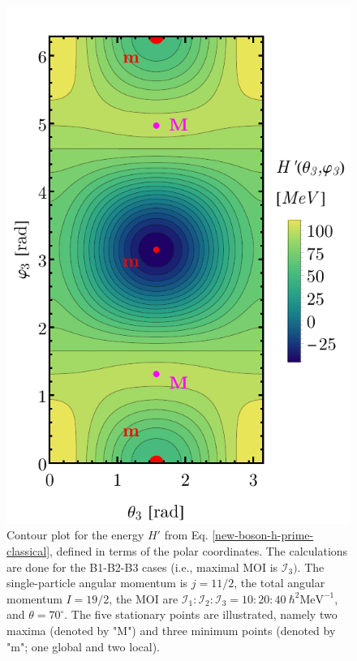 \begin{figure}
    \begin{center}
        \includegraphics[scale=0.7]{Chapters/Figures/New-Boson-Classical-H-3axis-quantization.pdf}
        \caption{Contour plot for the energy $H'$ from Eq. \ref{new-boson-h-prime-classical}, defined in terms of the polar coordinates. The calculations are done for the B1-B2-B3 cases (i.e., maximal MOI is $\mathcal{I}_3)$. The single-particle angular momentum is $j=11/2$, the total angular momentum $I=19/2$, the MOI are $\mathcal{I}_1:\mathcal{I}_2:\mathcal{I}_3=10:20:40\ \hbar^2\text{MeV}^{-1}$, and $\theta=70^\circ$. The five stationary points are illustrated, namely two maxima (denoted by "M") and three minimum points (denoted by "m"; one global and two local).}
        \label{new-boson-hprime-3axis-contour-plot}
    \end{center}
\end{figure}
